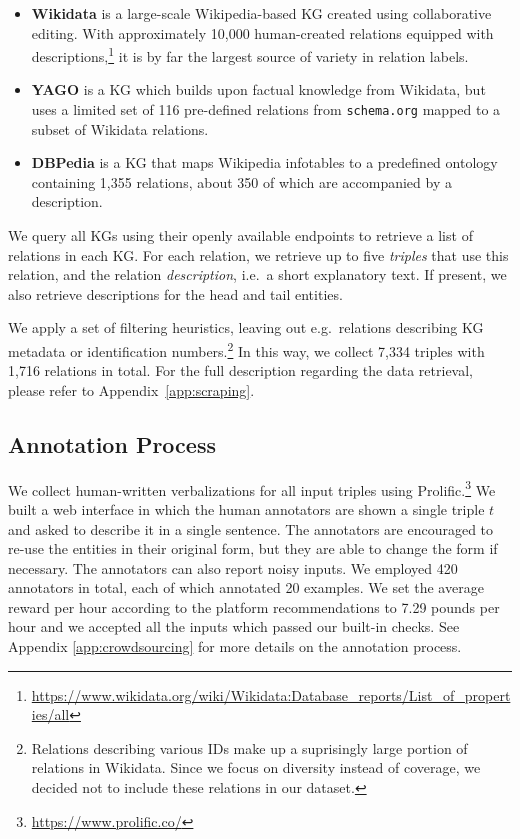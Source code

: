 \begin{itemize}
    \item \textbf{Wikidata} \cite{vrandevcic2014wikidata} is a large-scale Wikipedia-based KG created using collaborative editing. With approximately 10,000 human-created relations equipped with descriptions,\footnote{\url{https://www.wikidata.org/wiki/Wikidata:Database_reports/List_of_properties/all}} it is by far the largest source of variety in relation labels.
    \item \textbf{YAGO} \cite{pellissier2020yago} is a KG which builds upon factual knowledge from Wikidata, but uses a limited set of 116 pre-defined relations from \texttt{schema.org} \cite{guha2016schema} mapped to a subset of Wikidata relations.
    \item \textbf{DBPedia} \cite{lehmann2015dbpedia} is a KG that maps Wikipedia infotables to a predefined ontology containing 1,355 relations, about 350 of which are accompanied by a description.
\end{itemize}

We query all KGs using their openly available endpoints to retrieve a list of relations in each KG. For each relation, we retrieve up to five \textit{triples} that use this relation, and the relation \textit{description}, i.e.\ a short explanatory text.
If present, we also retrieve descriptions for the head and tail entities.

We apply a set of filtering heuristics, leaving out e.g.\ relations describing KG metadata or identification numbers.\footnote{Relations describing various IDs make up a suprisingly large portion of relations in Wikidata. Since we focus on diversity instead of coverage, we decided not to include these relations in our dataset.} In this way, we collect 7,334 triples with 1,716 relations in total. For the full description regarding the data retrieval, please refer to Appendix~\ref{app:scraping}.

\subsection{Annotation Process}
We collect human-written verbalizations for all input triples using Prolific.\footnote{\url{https://www.prolific.co/}} We built a web interface in which the human annotators are shown a single triple $t$ and asked to describe it in a single sentence. The annotators are encouraged to re-use the entities in their original form, but they are able to change the form if necessary. The annotators can also report noisy inputs. We employed 420 annotators in total, each of which annotated 20 examples. We set the average reward per hour according to the platform recommendations to  7.29 pounds per hour and we accepted all the inputs which passed our built-in checks. See Appendix \ref{app:crowdsourcing} for more details on the annotation process.



